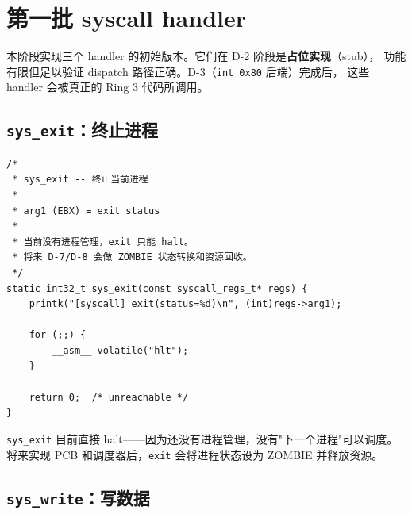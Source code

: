 \section{第一批 syscall handler}
\label{sec:syscall-handlers}

本阶段实现三个 handler 的初始版本。它们在 D-2 阶段是\textbf{占位实现}（stub），
功能有限但足以验证 dispatch 路径正确。D-3（\texttt{int 0x80} 后端）完成后，
这些 handler 会被真正的 Ring 3 代码所调用。

\subsection{\texttt{sys\_exit}：终止进程}

\begin{lstlisting}[style=cstyle]
/*
 * sys_exit -- 终止当前进程
 *
 * arg1 (EBX) = exit status
 *
 * 当前没有进程管理，exit 只能 halt。
 * 将来 D-7/D-8 会做 ZOMBIE 状态转换和资源回收。
 */
static int32_t sys_exit(const syscall_regs_t* regs) {
    printk("[syscall] exit(status=%d)\n", (int)regs->arg1);

    for (;;) {
        __asm__ volatile("hlt");
    }

    return 0;  /* unreachable */
}
\end{lstlisting}

\texttt{sys\_exit} 目前直接 halt——因为还没有进程管理，没有"下一个进程"可以调度。
将来实现 PCB 和调度器后，\texttt{exit} 会将进程状态设为 ZOMBIE 并释放资源。

\subsection{\texttt{sys\_write}：写数据}

